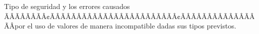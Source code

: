 Tipo de seguridad y los errores causados ÃÂÃÂÃÂÃÂ¢ÃÂÃÂÃÂÃÂÃÂÃÂÃÂÃÂÃÂÃÂÃÂÃÂ¢ÃÂÃÂÃÂÃÂÃÂÃÂÃÂÃÂpor el uso de valores de manera incompatible dadas sus tipos previstos.